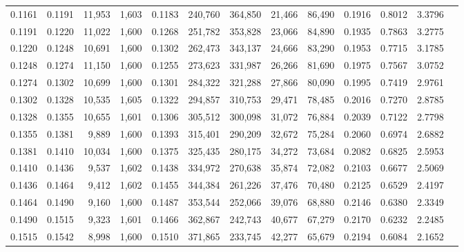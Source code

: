 \begin{tabular}{rrrrrrrrrrrrr}
0.1161 & 0.1191 & 11,953 & 1,603 &                                     0.1183 & 240,760 & 364,850 &  21,466 &  86,490 & 0.1916 & 0.8012 & 3.3796 \\
0.1191 & 0.1220 & 11,022 & 1,600 &                                     0.1268 & 251,782 & 353,828 &  23,066 &  84,890 & 0.1935 & 0.7863 & 3.2775 \\
0.1220 & 0.1248 & 10,691 & 1,600 &                                     0.1302 & 262,473 & 343,137 &  24,666 &  83,290 & 0.1953 & 0.7715 & 3.1785 \\
0.1248 & 0.1274 & 11,150 & 1,600 &                                     0.1255 & 273,623 & 331,987 &  26,266 &  81,690 & 0.1975 & 0.7567 & 3.0752 \\
0.1274 & 0.1302 & 10,699 & 1,600 &                                     0.1301 & 284,322 & 321,288 &  27,866 &  80,090 & 0.1995 & 0.7419 & 2.9761 \\
0.1302 & 0.1328 & 10,535 & 1,605 &                                     0.1322 & 294,857 & 310,753 &  29,471 &  78,485 & 0.2016 & 0.7270 & 2.8785 \\
0.1328 & 0.1355 & 10,655 & 1,601 &                                     0.1306 & 305,512 & 300,098 &  31,072 &  76,884 & 0.2039 & 0.7122 & 2.7798 \\
0.1355 & 0.1381 &  9,889 & 1,600 &                                     0.1393 & 315,401 & 290,209 &  32,672 &  75,284 & 0.2060 & 0.6974 & 2.6882 \\
0.1381 & 0.1410 & 10,034 & 1,600 &                                     0.1375 & 325,435 & 280,175 &  34,272 &  73,684 & 0.2082 & 0.6825 & 2.5953 \\
0.1410 & 0.1436 &  9,537 & 1,602 &                                     0.1438 & 334,972 & 270,638 &  35,874 &  72,082 & 0.2103 & 0.6677 & 2.5069 \\
0.1436 & 0.1464 &  9,412 & 1,602 &                                     0.1455 & 344,384 & 261,226 &  37,476 &  70,480 & 0.2125 & 0.6529 & 2.4197 \\
0.1464 & 0.1490 &  9,160 & 1,600 &                                     0.1487 & 353,544 & 252,066 &  39,076 &  68,880 & 0.2146 & 0.6380 & 2.3349 \\
0.1490 & 0.1515 &  9,323 & 1,601 &                                     0.1466 & 362,867 & 242,743 &  40,677 &  67,279 & 0.2170 & 0.6232 & 2.2485 \\
0.1515 & 0.1542 &  8,998 & 1,600 &                                     0.1510 & 371,865 & 233,745 &  42,277 &  65,679 & 0.2194 & 0.6084 & 2.1652 \\

\end{tabular}
